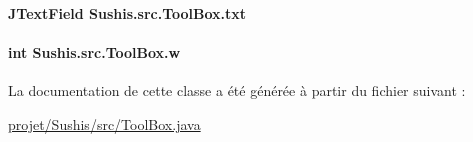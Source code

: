 \paragraph[{txt}]{\setlength{\rightskip}{0pt plus 5cm}J\+Text\+Field Sushis.\+src.\+Tool\+Box.\+txt\hspace{0.3cm}{\ttfamily [private]}}\label{classSushis_1_1src_1_1ToolBox_ad0a7dea17f66a3ce47f294007f85ade8}
\hypertarget{classSushis_1_1src_1_1ToolBox_a689f8c81667d4670ff2d02aa7ae20242}{}
\paragraph[{w}]{\setlength{\rightskip}{0pt plus 5cm}int Sushis.\+src.\+Tool\+Box.\+w\hspace{0.3cm}{\ttfamily [private]}}\label{classSushis_1_1src_1_1ToolBox_a689f8c81667d4670ff2d02aa7ae20242}


La documentation de cette classe a été générée à partir du fichier suivant \+:\begin{DoxyCompactItemize}
\item 
\hyperlink{projet_2Sushis_2src_2ToolBox_8java}{projet/\+Sushis/src/\+Tool\+Box.\+java}\end{DoxyCompactItemize}
